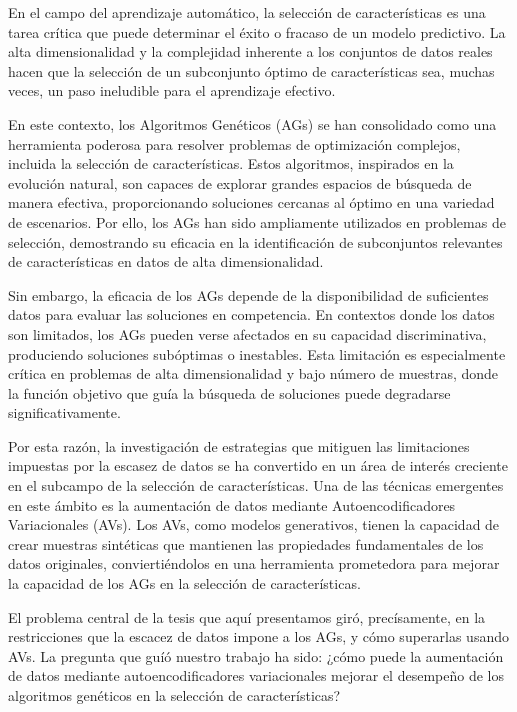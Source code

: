 
En el campo del aprendizaje automático, la selección de características es una tarea crítica que puede determinar el éxito o fracaso de un modelo predictivo. La alta dimensionalidad y la complejidad inherente a los conjuntos de datos reales hacen que la selección de un subconjunto óptimo de características sea, muchas veces, un paso ineludible para el aprendizaje efectivo.

En este contexto, los Algoritmos Genéticos (AGs) se han consolidado como una herramienta poderosa para resolver problemas de optimización complejos, incluida la selección de características. Estos algoritmos, inspirados en la evolución natural, son capaces de explorar grandes espacios de búsqueda de manera efectiva, proporcionando soluciones cercanas al óptimo en una variedad de escenarios. Por ello, los AGs han sido ampliamente utilizados en problemas de selección, demostrando su eficacia en la identificación de subconjuntos relevantes de características en datos de alta dimensionalidad.

Sin embargo, la eficacia de los AGs depende de la disponibilidad de suficientes datos para evaluar las soluciones en competencia. En contextos donde los datos son limitados, los AGs pueden verse afectados en su capacidad discriminativa, produciendo soluciones subóptimas o inestables. Esta limitación es especialmente crítica en problemas de alta dimensionalidad y bajo número de muestras, donde la función objetivo que guía la búsqueda de soluciones puede degradarse significativamente.

Por esta razón, la investigación de estrategias que mitiguen las limitaciones impuestas por la escasez de datos se ha convertido en un área de interés creciente en el subcampo de la selección de características. Una de las técnicas emergentes en este ámbito es la aumentación de datos mediante Autoencodificadores Variacionales (AVs). Los AVs, como modelos generativos, tienen la capacidad de crear muestras sintéticas que mantienen las propiedades fundamentales de los datos originales, conviertiéndolos en una herramienta prometedora para mejorar la capacidad de los AGs en la selección de características.

El problema central de la tesis que aquí presentamos giró, precísamente, en la restricciones que la escacez de datos impone a los AGs, y cómo superarlas usando AVs. La pregunta que guíó nuestro trabajo ha sido: ¿cómo puede la aumentación de datos mediante autoencodificadores variacionales mejorar el desempeño de los algoritmos genéticos en la selección de características?


